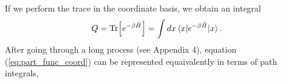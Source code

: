 \documentclass{article}
\newcommand{\be}{\begin{equation}}
\newcommand{\ee}{\end{equation}}
\begin{document}
If we perform the trace in the coordinate basis, we obtain an integral
\be \label{eq:part_func_coord}
  Q = \text{Tr} \Big[e^{-\beta \hat{H}}\Big] = \int dx \braket{x|e^{-\beta \hat{H}}|x} .
\ee
After going through a long process (see Appendix 4), equation (\ref{eq:part_func_coord}) can be represented equaivalently in terms of path integrals,
%
%
\end{document}
